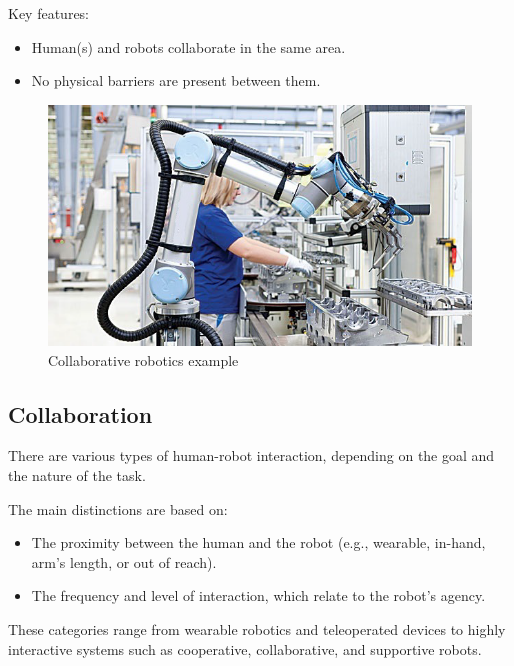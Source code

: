 Key features:
\begin{itemize}
  \item Human(s) and robots collaborate in the same area.
  \item No physical barriers are present between them.
\end{itemize}

\hfill
\begin{figure}[H]
    \centering
    \includegraphics[width=0.6\linewidth]{imgs/collaborative_robotics_example.png}
    \caption{Collaborative robotics example}
\end{figure}

\hfill

\subsection{Collaboration}

There are various types of human-robot interaction, depending on the goal and the nature of the task.

The main distinctions are based on:
\begin{itemize}
  \item The proximity between the human and the robot (e.g., wearable, in-hand, arm's length, or out of reach).
  \item The frequency and level of interaction, which relate to the robot's agency.
\end{itemize}

These categories range from wearable robotics and teleoperated devices to highly interactive systems such as cooperative, collaborative, and supportive robots.

